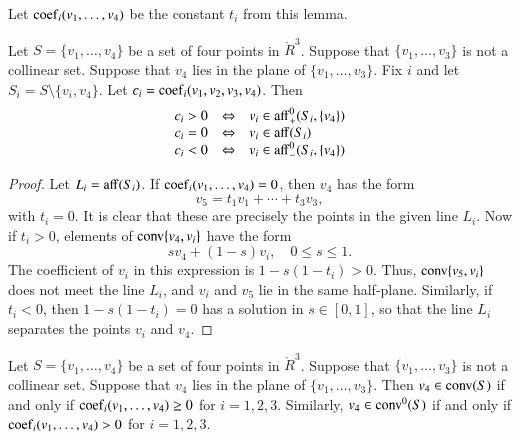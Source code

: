\begin{definition}[coef] 
Let ${\operatorname{coef}}_i(v_1,\ldots,v_4)$
be the constant $t_i$ from this lemma.
\end{definition}

\newpage


\begin{lemma}
Let $S=\{v_1,\ldots,v_4\}$ be
a set of four points in $\ring{R}^3$.  Suppose
that $\{v_1,\ldots,v_3\}$ is not a collinear
set. 
Suppose that $v_4$ lies in the plane of
$\{v_1,\ldots,v_3\}$.  
Fix $i$ and let $S_i = S\setminus \{v_i,v_4\}$.
Let $c_i = {\operatorname{coef}}_i(v_1,v_2,v_3,v_4)$. 
Then 
   $$
   \begin{array}{lll}
     c_i > 0  & \Leftrightarrow & v_i \in {\operatorname{aff}}_+^0(S_i,\{v_4\})\\
     c_i = 0 & \Leftrightarrow & v_i \in {\operatorname{aff}}(S_i)\\
     c_i < 0 & \Leftrightarrow & v_i \in {\operatorname{aff}}_-^0(S_i,\{v_4\})\\
     \end{array}
   $$
\end{lemma}

\begin{proof}
  Let $L_i ={\operatorname{aff}}(S_i)$.
If ${\operatorname{coef}}_i(v_1,\ldots,v_4)=0$, then $v_4$
has the form
	$$
	v_5 = t_1 v_1 + \cdots + t_3 v_3,
	$$
with $t_i=0$.  It is clear that these are
precisely the points in the given line $L_i$.
Now if $t_i>0$,
elements of
${\operatorname{conv}}\{v_4,v_i\}$ have the form
	$$s v_4 + (1-s) v_i,\quad 0\le s \le 1.$$
The coefficient of $v_i$ in this expression
is $1-s(1-t_i)>0$.  Thus, ${\operatorname{conv}}\{v_5,v_i\}$
does not meet the line $L_i$, and $v_i$ and $v_5$
lie in the same half-plane.  Similarly,
if $t_i<0$, then $1-s(1-t_i)=0$ has a solution
in $s\in[0,1]$, so that the line $L_i$ separates the
points $v_i$ and $v_4$.
\end{proof}
\newpage

\begin{lemma}
Let $S=\{v_1,\ldots,v_4\}$ be
a set of four points in $\ring{R}^3$.  Suppose
that $\{v_1,\ldots,v_3\}$ is not a collinear
set. 
Suppose that $v_4$ lies in the plane of
$\{v_1,\ldots,v_3\}$.  
 Then $v_4\in{\operatorname{conv}}(S)$ if and only
if  
${\operatorname{coef}}_i(v_1,\ldots,v_4)\ge0$ 
for $i=1,2,3$.
Similarly, $v_4\in{\operatorname{conv}}^0(S)$ if and only
if  
${\operatorname{coef}}_i(v_1,\ldots,v_4)>0$ 
for $i=1,2,3$.
\end{lemma}

